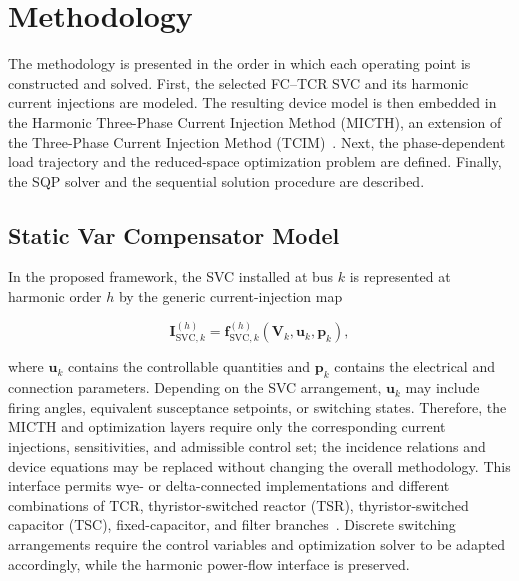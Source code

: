\documentclass[journal]{IEEEtran}
\begin{document}

\section{Methodology}
\label{sec:methodology}

The methodology is presented in the order in which each operating point is
constructed and solved. First, the selected FC--TCR SVC and its harmonic
current injections are modeled. The resulting device model is then embedded
in the Harmonic Three-Phase Current Injection Method (MICTH), an extension of
the Three-Phase Current Injection Method (TCIM)~\cite{garcia2000three,Arruda2003}.
Next, the phase-dependent load trajectory and the reduced-space optimization
problem are defined. Finally, the SQP solver and the sequential solution
procedure are described.

\subsection{Static Var Compensator Model}
\label{subsec:svc_rating}

In the proposed framework, the SVC installed at bus $k$ is represented at
harmonic order $h$ by the generic current-injection map

\begin{equation}
    \mathbf{I}^{(h)}_{\mathrm{SVC},k} =
    \mathbf{f}^{(h)}_{\mathrm{SVC},k}
    \!\left(\mathbf{V}_k,\mathbf{u}_k,\mathbf{p}_k\right),
    \label{eq:generic_svc_current}
\end{equation}

\noindent where $\mathbf{u}_k$ contains the controllable quantities and
$\mathbf{p}_k$ contains the electrical and connection parameters. Depending on
the SVC arrangement, $\mathbf{u}_k$ may include firing angles, equivalent
susceptance setpoints, or switching states. Therefore, the MICTH and
optimization layers require only the corresponding current injections,
sensitivities, and admissible control set; the incidence relations and device
equations may be replaced without changing the overall methodology. This
interface permits wye- or delta-connected implementations and different
combinations of TCR, thyristor-switched reactor (TSR), thyristor-switched
capacitor (TSC), fixed-capacitor, and filter
branches~\cite{MathurVarma2002,IEEE1031_2011}.
Discrete switching arrangements require the control variables and optimization
solver to be adapted accordingly, while the harmonic power-flow interface is
preserved.
\end{document}

